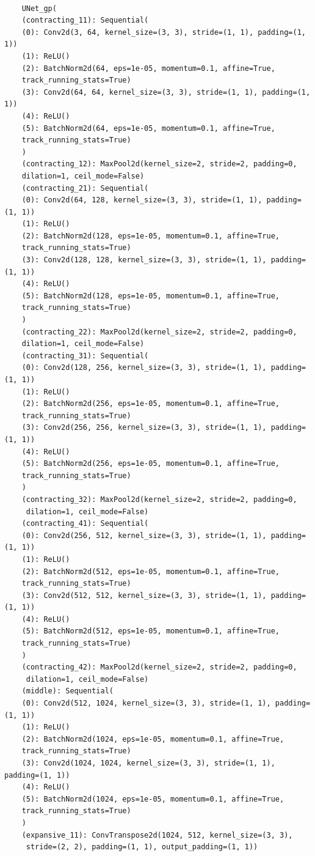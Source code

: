	\begin{lstlisting}[caption={Unet GP model architecture description},label=lst:unetgp]
	
	UNet_gp(
	(contracting_11): Sequential(
	(0): Conv2d(3, 64, kernel_size=(3, 3), stride=(1, 1), padding=(1, 1))
	(1): ReLU()
	(2): BatchNorm2d(64, eps=1e-05, momentum=0.1, affine=True, 
	track_running_stats=True)
	(3): Conv2d(64, 64, kernel_size=(3, 3), stride=(1, 1), padding=(1, 1))
	(4): ReLU()
	(5): BatchNorm2d(64, eps=1e-05, momentum=0.1, affine=True, 
	track_running_stats=True)
	)
	(contracting_12): MaxPool2d(kernel_size=2, stride=2, padding=0, 
	dilation=1, ceil_mode=False)
	(contracting_21): Sequential(
	(0): Conv2d(64, 128, kernel_size=(3, 3), stride=(1, 1), padding=(1, 1))
	(1): ReLU()
	(2): BatchNorm2d(128, eps=1e-05, momentum=0.1, affine=True, 
	track_running_stats=True)
	(3): Conv2d(128, 128, kernel_size=(3, 3), stride=(1, 1), padding=(1, 1))
	(4): ReLU()
	(5): BatchNorm2d(128, eps=1e-05, momentum=0.1, affine=True, 
	track_running_stats=True)
	)
	(contracting_22): MaxPool2d(kernel_size=2, stride=2, padding=0, 
	dilation=1, ceil_mode=False)
	(contracting_31): Sequential(
	(0): Conv2d(128, 256, kernel_size=(3, 3), stride=(1, 1), padding=(1, 1))
	(1): ReLU()
	(2): BatchNorm2d(256, eps=1e-05, momentum=0.1, affine=True, 
	track_running_stats=True)
	(3): Conv2d(256, 256, kernel_size=(3, 3), stride=(1, 1), padding=(1, 1))
	(4): ReLU()
	(5): BatchNorm2d(256, eps=1e-05, momentum=0.1, affine=True, 
	track_running_stats=True)
	)
	(contracting_32): MaxPool2d(kernel_size=2, stride=2, padding=0,
	 dilation=1, ceil_mode=False)
	(contracting_41): Sequential(
	(0): Conv2d(256, 512, kernel_size=(3, 3), stride=(1, 1), padding=(1, 1))
	(1): ReLU()
	(2): BatchNorm2d(512, eps=1e-05, momentum=0.1, affine=True, 
	track_running_stats=True)
	(3): Conv2d(512, 512, kernel_size=(3, 3), stride=(1, 1), padding=(1, 1))
	(4): ReLU()
	(5): BatchNorm2d(512, eps=1e-05, momentum=0.1, affine=True, 
	track_running_stats=True)
	)
	(contracting_42): MaxPool2d(kernel_size=2, stride=2, padding=0,
	 dilation=1, ceil_mode=False)
	(middle): Sequential(
	(0): Conv2d(512, 1024, kernel_size=(3, 3), stride=(1, 1), padding=(1, 1))
	(1): ReLU()
	(2): BatchNorm2d(1024, eps=1e-05, momentum=0.1, affine=True, 
	track_running_stats=True)
	(3): Conv2d(1024, 1024, kernel_size=(3, 3), stride=(1, 1), padding=(1, 1))
	(4): ReLU()
	(5): BatchNorm2d(1024, eps=1e-05, momentum=0.1, affine=True, 
	track_running_stats=True)
	)
	(expansive_11): ConvTranspose2d(1024, 512, kernel_size=(3, 3),
	 stride=(2, 2), padding=(1, 1), output_padding=(1, 1))

\end{lstlisting}

